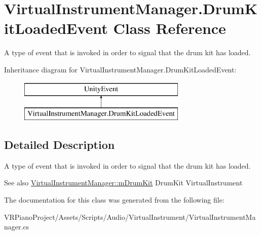 \hypertarget{class_virtual_instrument_manager_1_1_drum_kit_loaded_event}{}\section{Virtual\+Instrument\+Manager.\+Drum\+Kit\+Loaded\+Event Class Reference}
\label{class_virtual_instrument_manager_1_1_drum_kit_loaded_event}


A type of event that is invoked in order to signal that the drum kit has loaded.  


Inheritance diagram for Virtual\+Instrument\+Manager.\+Drum\+Kit\+Loaded\+Event\+:\begin{figure}[H]
\begin{center}
\leavevmode
\includegraphics[height=2.000000cm]{class_virtual_instrument_manager_1_1_drum_kit_loaded_event}
\end{center}
\end{figure}


\subsection{Detailed Description}
A type of event that is invoked in order to signal that the drum kit has loaded. 

\begin{DoxySeeAlso}{See also}
\hyperlink{class_virtual_instrument_manager_a0bc7c9f776b0d2dae0ccb1f1ee5f2143}{Virtual\+Instrument\+Manager\+::m\+Drum\+Kit} Drum\+Kit Virtual\+Instrument 
\end{DoxySeeAlso}


The documentation for this class was generated from the following file\+:\begin{DoxyCompactItemize}
\item 
V\+R\+Piano\+Project/\+Assets/\+Scripts/\+Audio/\+Virtual\+Instrument/Virtual\+Instrument\+Manager.\+cs\end{DoxyCompactItemize}
